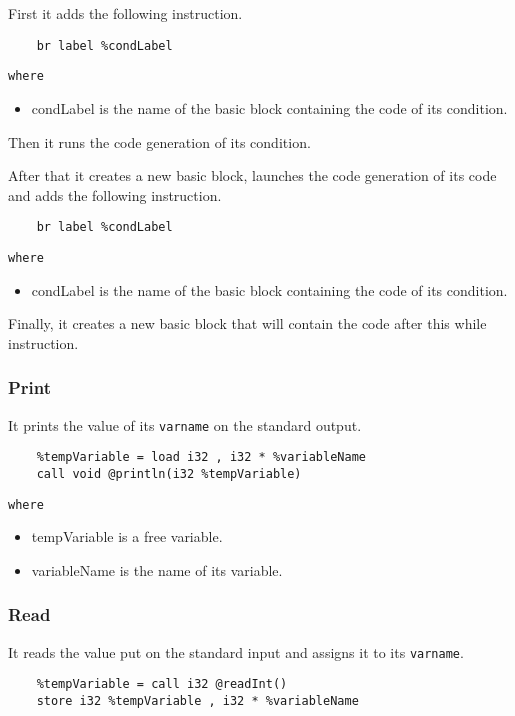 \documentclass{article}
\begin{document}
First it adds the following instruction.

\begin{lstlisting}
    br label %condLabel
\end{lstlisting}

\noindent\texttt{where}

\begin{itemize}
    \item condLabel is the name of the basic block containing the code of its condition.
\end{itemize}

Then it runs the code generation of its condition.

After that it creates a new basic block, launches the code generation of its code and adds the following instruction.

\begin{lstlisting}
    br label %condLabel
\end{lstlisting}

\noindent\texttt{where}

\begin{itemize}
    \item condLabel is the name of the basic block containing the code of its condition.
\end{itemize}

Finally, it creates a new basic block that will contain the code after this while instruction.


\subsubsection{Print}
It prints the value of its \texttt{varname} on the standard output.
\begin{lstlisting}
    %tempVariable = load i32 , i32 * %variableName
    call void @println(i32 %tempVariable)
\end{lstlisting}

\noindent\texttt{where}

\begin{itemize}
    \item tempVariable is a free variable.
    \item variableName is the name of its variable.
\end{itemize}

\subsubsection{Read}
It reads the value put on the standard input and assigns it to its \texttt{varname}.
\begin{lstlisting}
    %tempVariable = call i32 @readInt()
    store i32 %tempVariable , i32 * %variableName
\end{lstlisting}
\end{document}
